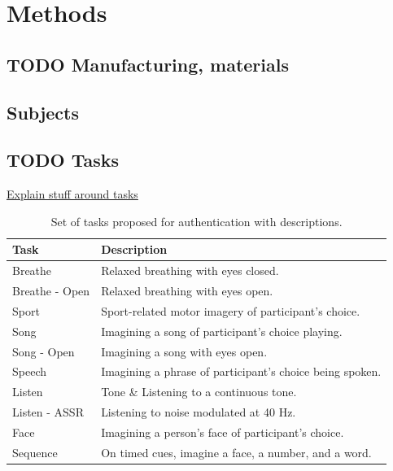 \documentclass[11pt]{article}
\begin{document}
\section{Methods}
\label{sec:org63d105c}
\subsection{{\bfseries\sffamily TODO} Manufacturing, materials}
\label{sec:orgb483219}
\subsection{Subjects}
\label{sec:orgaf30da9}
\subsection{{\bfseries\sffamily TODO} Tasks}
\label{sec:org86eea32}

\uline{Explain stuff around tasks}

\begin{table}[h]
\centering
\begin{tabular}{ll}
\textbf{\textbf{Task}} & \textbf{\textbf{Description}}\\
\hline
Breathe & Relaxed breathing with eyes closed.\\
Breathe - Open & Relaxed breathing with eyes open.\\
Sport & Sport-related motor imagery of participant's choice.\\
Song & Imagining a song of participant's choice playing.\\
Song - Open & Imagining a song with eyes open.\\
Speech & Imagining a phrase of participant's choice being spoken.\\
Listen & Tone \& Listening to a continuous tone.\\
Listen - ASSR & Listening to noise modulated at 40 Hz.\\
Face & Imagining a person's face of participant's choice.\\
Sequence & On timed cues, imagine a face, a number, and a word.\\
\hline
\end{tabular}
\caption{Set of tasks proposed for authentication with descriptions.}
\end{table}
\end{document}
